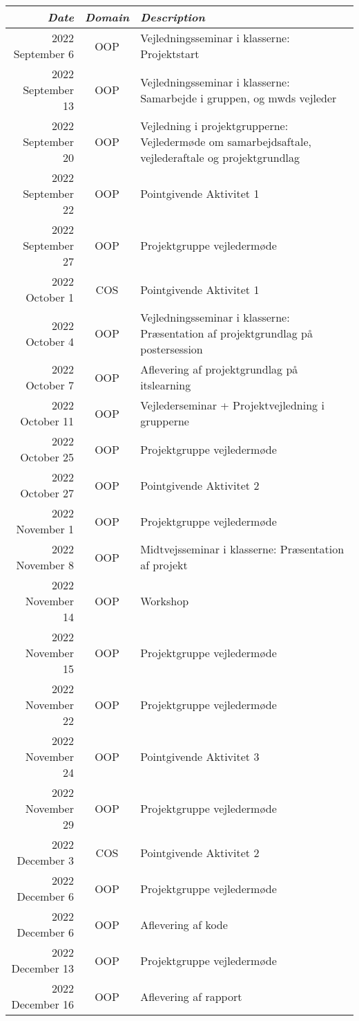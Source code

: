 \begin{tabular}{|r|c|l|}
  \hline
  \emph{Date} & \emph{Domain} & \emph{Description} \\
  \hline
  2022 September 6 & OOP & Vejledningsseminar i klasserne: Projektstart \\
  \hline
  2022 September 13 & OOP & Vejledningsseminar i klasserne: Samarbejde i gruppen, og mwds vejleder \\
  \hline
  2022 September 20 & OOP & Vejledning i projektgrupperne: Vejledermøde om samarbejdsaftale, vejlederaftale og projektgrundlag \\
  \hline
  2022 September 22 & OOP & Pointgivende Aktivitet 1 \\
  \hline
  2022 September 27 & OOP & Projektgruppe vejledermøde \\
  \hline
  2022 October 1 & COS & Pointgivende Aktivitet 1 \\
  \hline
  2022 October 4 & OOP & Vejledningsseminar i klasserne: Præsentation af projektgrundlag på postersession \\
  \hline
  2022 October 7 & OOP & Aflevering af projektgrundlag på itslearning \\
  \hline
  2022 October 11 & OOP & Vejlederseminar + Projektvejledning i grupperne \\
  \hline
  2022 October 25 & OOP & Projektgruppe vejledermøde \\
  \hline
  2022 October 27 & OOP & Pointgivende Aktivitet 2 \\
  \hline
  2022 November 1 & OOP & Projektgruppe vejledermøde \\
  \hline
  2022 November 8 & OOP & Midtvejsseminar i klasserne: Præsentation af projekt \\
  \hline
  2022 November 14 & OOP & Workshop \\
  \hline
  2022 November 15 & OOP & Projektgruppe vejledermøde \\
  \hline
  2022 November 22 & OOP & Projektgruppe vejledermøde \\
  \hline
  2022 November 24 & OOP & Pointgivende Aktivitet 3 \\
  \hline
  2022 November 29 & OOP & Projektgruppe vejledermøde \\
  \hline
  2022 December 3 & COS & Pointgivende Aktivitet 2 \\
  \hline
  2022 December 6 & OOP & Projektgruppe vejledermøde \\
  \hline
  2022 December 6 & OOP & Aflevering af kode \\
  \hline
  2022 December 13 & OOP & Projektgruppe vejledermøde \\
  \hline
  2022 December 16 & OOP & Aflevering af rapport \\
  \hline
\end{tabular}
